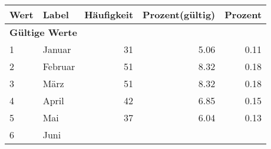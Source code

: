      \begin{longtable}{lXrrr}
     \toprule
     \textbf{Wert} & \textbf{Label} & \textbf{Häufigkeit} & \textbf{Prozent(gültig)} & \textbf{Prozent} \\
     \endhead
     \midrule
     \multicolumn{5}{l}{\textbf{Gültige Werte}}\\

     1 &
     \multicolumn{1}{X}{ Januar   } &


       \num{31} &
       \num[round-mode=places,round-precision=2]{5.06} &
         \num[round-mode=places,round-precision=2]{0.11} \\

     2 &
     \multicolumn{1}{X}{ Februar   } &


       \num{51} &
       \num[round-mode=places,round-precision=2]{8.32} &
         \num[round-mode=places,round-precision=2]{0.18} \\

     3 &
     \multicolumn{1}{X}{ März   } &


       \num{51} &
       \num[round-mode=places,round-precision=2]{8.32} &
         \num[round-mode=places,round-precision=2]{0.18} \\

     4 &
     \multicolumn{1}{X}{ April   } &


       \num{42} &
       \num[round-mode=places,round-precision=2]{6.85} &
         \num[round-mode=places,round-precision=2]{0.15} \\

     5 &
     \multicolumn{1}{X}{ Mai   } &


       \num{37} &
       \num[round-mode=places,round-precision=2]{6.04} &
         \num[round-mode=places,round-precision=2]{0.13} \\

     6 &
     \multicolumn{1}{X}{ Juni   } &



\end{longtable}
